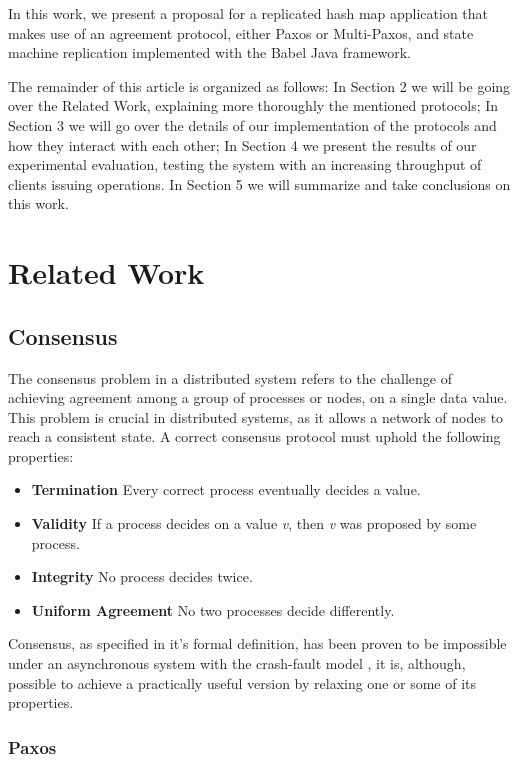 \documentclass[sigconf]{acmart}
\begin{document}
In this work, we present a proposal for a replicated hash map application that makes use of an agreement protocol, either Paxos or Multi-Paxos, and state machine replication implemented with the Babel \cite{fouto2022babel} Java framework.

The remainder of this article is organized as follows: In Section 2 we will be going over the Related Work, explaining more thoroughly the mentioned protocols; In Section 3 we will go over the details of our implementation of the protocols and how they interact with each other; In Section 4 we present the results of our experimental evaluation, testing the system with an increasing throughput of clients issuing operations. In Section 5 we will summarize and take conclusions on this work.


\section{Related Work}

\subsection{Consensus}

The consensus problem in a distributed system refers to the challenge of achieving agreement among a group of processes or nodes, on a single data value. This problem is crucial in distributed systems, as it allows a network of nodes to reach a consistent state. A correct consensus protocol must uphold the following properties:

\begin{itemize}
    \item \textbf{Termination} Every correct process eventually decides a value.
    \item \textbf{Validity} If a process decides on a value \textit{v}, then \textit{v} was proposed by some process.
    \item \textbf{Integrity} No process decides twice.
    \item \textbf{Uniform Agreement} No two processes decide differently. 
\end{itemize}

Consensus, as specified in it's formal definition, has been proven to be impossible under an asynchronous system with the crash-fault model \cite{fischer1985impossibility}, it is, although, possible to achieve a practically useful version by relaxing one or some of its properties.

\subsubsection{Paxos} 
\end{document}
